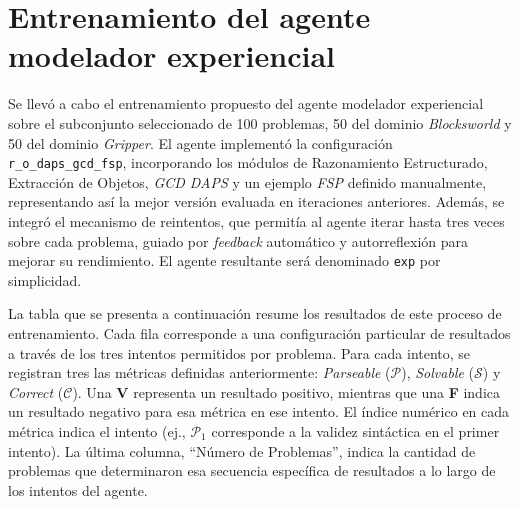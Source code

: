 \section{Entrenamiento del agente modelador experiencial}

Se llevó a cabo el entrenamiento propuesto del agente modelador experiencial sobre el subconjunto seleccionado de 100 problemas, 50 del dominio \textit{Blocksworld} y 50 del dominio \textit{Gripper}. El agente implementó la configuración \texttt{r\_o\_daps\_gcd\_fsp}, incorporando los módulos de Razonamiento Estructurado, Extracción de Objetos, \textit{GCD DAPS} y un ejemplo \textit{FSP} definido manualmente, representando así la mejor versión evaluada en iteraciones anteriores. Además, se integró el mecanismo de reintentos, que permitía al agente iterar hasta tres veces sobre cada problema, guiado por \textit{feedback} automático y autorreflexión para mejorar su rendimiento. El agente resultante será denominado \texttt{exp} por simplicidad.

La tabla que se presenta a continuación resume los resultados de este proceso de entrenamiento. Cada fila corresponde a una configuración particular de resultados a través de los tres intentos permitidos por problema. Para cada intento, se registran tres las métricas definidas anteriormente: \textit{Parseable} ($\mathcal{P}$), \textit{Solvable} ($\mathcal{S}$) y \textit{Correct} ($\mathcal{C}$). Una \textcolor{verde}{\textbf{V}} representa un resultado positivo, mientras que una \textcolor{rojo}{\textbf{F}} indica un resultado negativo para esa métrica en ese intento. El índice numérico en cada métrica indica el intento (ej., $\mathcal{P}_1$ corresponde a la validez sintáctica en el primer intento). La última columna, ``Número de Problemas'', indica la cantidad de problemas que determinaron esa secuencia específica de resultados a lo largo de los intentos del agente.

